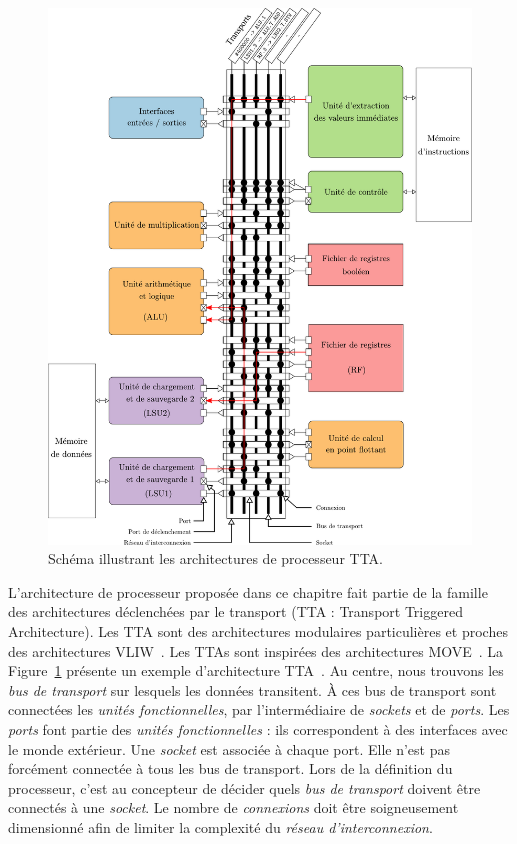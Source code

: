 \begin{figure}[htp]
\centering
\includegraphics[width=\textwidth]{main/ch4_fig/archi_tta}
\caption{Schéma illustrant les architectures de processeur TTA.}
\label{fig:tta_example}
\end{figure}



L'architecture de processeur proposée dans ce chapitre fait partie de la famille des architectures déclenchées par le transport (TTA : Transport Triggered Architecture). Les TTA sont des architectures modulaires particulières et proches des architectures VLIW~\cite{corporaal_microprocessor_1997}. Les TTAs sont inspirées des architectures MOVE~\cite{1051344}. La Figure~\ref{fig:tta_example} présente un exemple d'architecture TTA~\cite{pekka_phd_2012}. Au centre, nous trouvons les \textit{bus de transport} sur lesquels les données transitent. \`A ces bus de transport sont connectées les \textit{unités fonctionnelles}, par l'intermédiaire de \textit{sockets} et de \textit{ports}. Les \textit{ports} font partie des \textit{unités fonctionnelles} : ils correspondent à des interfaces avec le monde extérieur. Une \textit{socket} est associée à chaque port. Elle n'est pas forcément connectée à tous les bus de transport. Lors de la définition du processeur, c'est au concepteur de décider quels \textit{bus de transport} doivent être connectés à une \textit{socket}. Le nombre de \textit{connexions} doit être soigneusement dimensionné afin de limiter la complexité du \textit{réseau d'interconnexion}.

